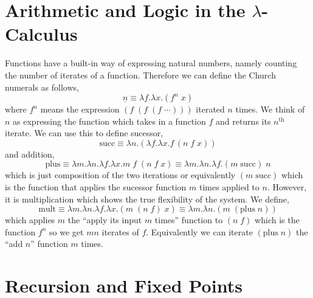 \documentclass[12pt]{article}
\begin{document}
\section{Arithmetic and Logic in the $\lambda$-Calculus}

Functions have a built-in way of expressing natural numbers, namely counting the number of iterates of a function. Therefore we can define the Church numerals as follows,
\[ \underline{n} \equiv \lambda f . \lambda x . (f^n \; x) \]
where $f^n$ means the expression $(f \; (f \; (f \; \cdots)))$ iterated $n$ times. We think of $n$ as expressing the function which takes in a function $f$ and returns its $n^{\text{th}}$ iterate. We can use this to define sucessor,
\[ \text{succ} \equiv \lambda n . (\lambda f . \lambda x. f \, (n \; f \; x)) \]
and addition,
\[ \text{plus} \equiv \lambda m . \lambda n. \lambda f. \lambda x . m \; f \; (n \; f \; x) \equiv \lambda m . \lambda n . \lambda f . (m \; \text{succ}) \; n\]
which is just composition of the two iterations or equivalently $(m \; \text{succ})$ which is the function that applies the sucessor function $m$ times applied to $n$. However, it is multiplication which shows the true flexibility of the system. We define,
\[ \text{mult} \equiv \lambda m . \lambda n . \lambda f . \lambda x . (m \; (n \; f) \; x) \equiv \lambda m . \lambda n . (m \; (\text{plus} \; n)) \]
which applies $m$ the ``apply its input $m$ times'' function to $(n \; f)$ which is the function $f^n$ so we get $mn$ iterates of $f$. Equivalently we can iterate $(\text{plus} \; n)$ the ``add $n$'' function $m$ times.  


\section{Recursion and Fixed Points}
\end{document}
